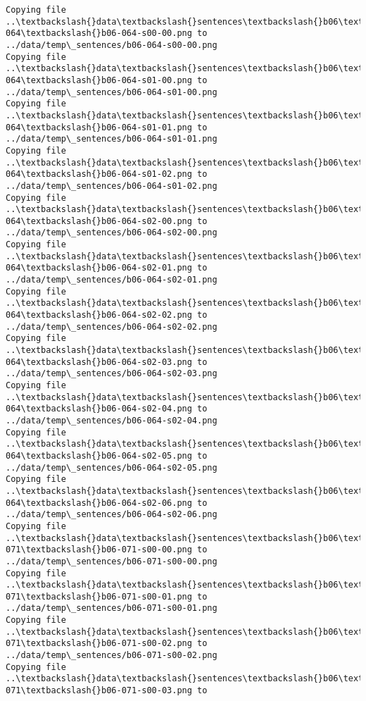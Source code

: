 \documentclass[11pt]{article}
\begin{document}
\begin{Verbatim}[commandchars=\\\{\}]
Copying file ..\textbackslash{}data\textbackslash{}sentences\textbackslash{}b06\textbackslash{}b06-064\textbackslash{}b06-064-s00-00.png to
../data/temp\_sentences/b06-064-s00-00.png
Copying file ..\textbackslash{}data\textbackslash{}sentences\textbackslash{}b06\textbackslash{}b06-064\textbackslash{}b06-064-s01-00.png to
../data/temp\_sentences/b06-064-s01-00.png
Copying file ..\textbackslash{}data\textbackslash{}sentences\textbackslash{}b06\textbackslash{}b06-064\textbackslash{}b06-064-s01-01.png to
../data/temp\_sentences/b06-064-s01-01.png
Copying file ..\textbackslash{}data\textbackslash{}sentences\textbackslash{}b06\textbackslash{}b06-064\textbackslash{}b06-064-s01-02.png to
../data/temp\_sentences/b06-064-s01-02.png
Copying file ..\textbackslash{}data\textbackslash{}sentences\textbackslash{}b06\textbackslash{}b06-064\textbackslash{}b06-064-s02-00.png to
../data/temp\_sentences/b06-064-s02-00.png
Copying file ..\textbackslash{}data\textbackslash{}sentences\textbackslash{}b06\textbackslash{}b06-064\textbackslash{}b06-064-s02-01.png to
../data/temp\_sentences/b06-064-s02-01.png
Copying file ..\textbackslash{}data\textbackslash{}sentences\textbackslash{}b06\textbackslash{}b06-064\textbackslash{}b06-064-s02-02.png to
../data/temp\_sentences/b06-064-s02-02.png
Copying file ..\textbackslash{}data\textbackslash{}sentences\textbackslash{}b06\textbackslash{}b06-064\textbackslash{}b06-064-s02-03.png to
../data/temp\_sentences/b06-064-s02-03.png
Copying file ..\textbackslash{}data\textbackslash{}sentences\textbackslash{}b06\textbackslash{}b06-064\textbackslash{}b06-064-s02-04.png to
../data/temp\_sentences/b06-064-s02-04.png
Copying file ..\textbackslash{}data\textbackslash{}sentences\textbackslash{}b06\textbackslash{}b06-064\textbackslash{}b06-064-s02-05.png to
../data/temp\_sentences/b06-064-s02-05.png
Copying file ..\textbackslash{}data\textbackslash{}sentences\textbackslash{}b06\textbackslash{}b06-064\textbackslash{}b06-064-s02-06.png to
../data/temp\_sentences/b06-064-s02-06.png
Copying file ..\textbackslash{}data\textbackslash{}sentences\textbackslash{}b06\textbackslash{}b06-071\textbackslash{}b06-071-s00-00.png to
../data/temp\_sentences/b06-071-s00-00.png
Copying file ..\textbackslash{}data\textbackslash{}sentences\textbackslash{}b06\textbackslash{}b06-071\textbackslash{}b06-071-s00-01.png to
../data/temp\_sentences/b06-071-s00-01.png
Copying file ..\textbackslash{}data\textbackslash{}sentences\textbackslash{}b06\textbackslash{}b06-071\textbackslash{}b06-071-s00-02.png to
../data/temp\_sentences/b06-071-s00-02.png
Copying file ..\textbackslash{}data\textbackslash{}sentences\textbackslash{}b06\textbackslash{}b06-071\textbackslash{}b06-071-s00-03.png to

\end{Verbatim}
\end{document}
